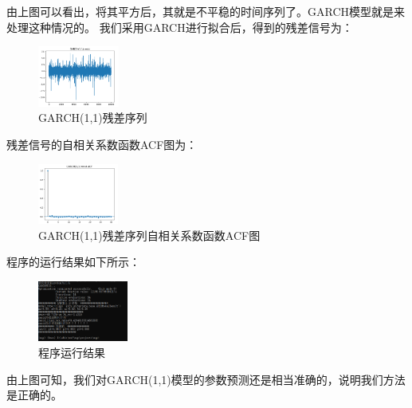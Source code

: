 \documentclass{article}
\begin{document}
由上图可以看出，将其平方后，其就是不平稳的时间序列了。GARCH模型就是来处理这种情况的。\newline
我们采用GARCH进行拟合后，得到的残差信号为：
\begin{figure}[H]
	\caption{GARCH(1,1)残差序列}
	\label{f000034}
	\centering
	\includegraphics[height=2cm]{images/f000034}
\end{figure}
残差信号的自相关系数函数ACF图为：
\begin{figure}[H]
	\caption{GARCH(1,1)残差序列自相关系数函数ACF图}
	\label{f000035}
	\centering
	\includegraphics[height=2cm]{images/f000035}
\end{figure}
程序的运行结果如下所示：
\begin{figure}[H]
	\caption{程序运行结果}
	\label{f000036}
	\centering
	\includegraphics[height=2cm]{images/f000036}
\end{figure}
由上图可知，我们对GARCH(1,1)模型的参数预测还是相当准确的，说明我们方法是正确的。
\end{document}
